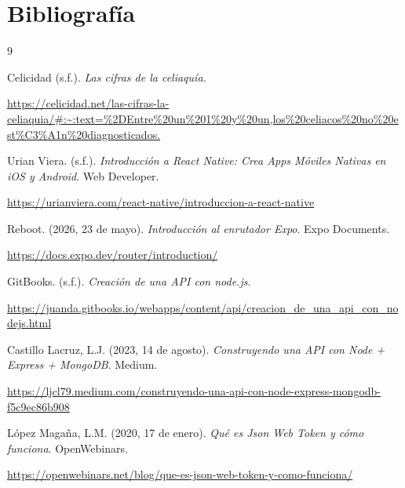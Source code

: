 \documentclass[a4paper,11pt]{article}
\begin{document}
\section{Bibliografía}
\renewcommand{\refname}{Fuentes consultadas}
\begin{thebibliography}{9}

    Celicidad (s.f.). \textit{Las cifras de la celiaquía.}

    \url{https://celicidad.net/las-cifras-la-celiaquia/#:~:text=%2DEntre%20un%201%20y%20un,los%20celiacos%20no%20est%C3%A1n%20diagnosticados.}

    \vspace{0.3cm}

    Urian Viera. (s.f.). \textit{Introducción a React Native: Crea Apps Móviles Nativas en iOS y Android}. Web Developer.

    \url{https://urianviera.com/react-native/introduccion-a-react-native}

    \vspace{0.3cm}

    Reboot. (2026, 23 de mayo). \textit{Introducción al enrutador Expo}. Expo Documents.

    \url{https://docs.expo.dev/router/introduction/}

    \vspace{0.3cm}

    GitBooks. (s.f.). \textit{Creación de una API con node.js}.

    \url{https://juanda.gitbooks.io/webapps/content/api/creacion_de_una_api_con_nodejs.html}
    

    \vspace{0.3cm}

    Castillo Lacruz, L.J. (2023, 14 de agosto). \textit{Construyendo una API con Node + Express + MongoDB}. Medium.

    \url{https://ljcl79.medium.com/construyendo-una-api-con-node-express-mongodb-f5c9ec86b908}

    \vspace{0.3cm}

    López Magaña, L.M. (2020, 17 de enero). \textit{Qué es Json Web Token y cómo funciona}. OpenWebinars.

    \url{https://openwebinars.net/blog/que-es-json-web-token-y-como-funciona/}

    \vspace{0.3cm}


\end{thebibliography}
\end{document}
